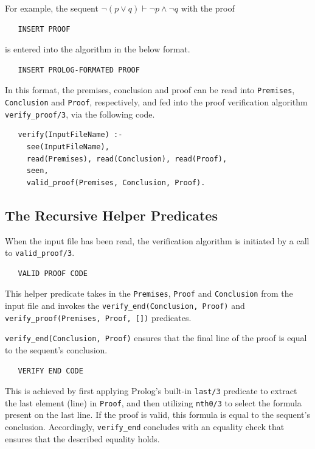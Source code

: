 \documentclass[a4paper, 11pt]{article}
\begin{document}
   For example, the sequent 
   $\neg (p \vee q) \vdash \neg p \wedge \neg q$ with the
   proof

\begin{verbatim}
   INSERT PROOF
\end{verbatim}

   is entered into the algorithm in the below format.

\begin{verbatim}
   INSERT PROLOG-FORMATED PROOF
\end{verbatim}

   In this format, the premises, conclusion and proof can be
   read into \texttt{Premises}, \texttt{Conclusion} and
   \texttt{Proof}, respectively, and fed into the proof
   verification algorithm \texttt{verify\_proof/3}, via the
   following code.

\begin{verbatim}
   verify(InputFileName) :-
     see(InputFileName),
     read(Premises), read(Conclusion), read(Proof),
     seen,
     valid_proof(Premises, Conclusion, Proof).
\end{verbatim}





   \subsection{The Recursive Helper Predicates}
   \label{recursive-helper-predicates}

   When the input file has been read, the verification
   algorithm is initiated by a call to
   \texttt{valid\_proof/3}. 
   
\begin{verbatim}
   VALID PROOF CODE
\end{verbatim}

   This helper predicate takes in the
   \texttt{Premises}, \texttt{Proof} and \texttt{Conclusion}
   from the input file and invokes the 
   \texttt{verify\_end(Conclusion, Proof)} and \\
   \texttt{verify\_proof(Premises, Proof, [])} predicates.
   \bigbreak

   \texttt{verify\_end(Conclusion, Proof)} ensures 
   that the final line of the proof is equal to the
   sequent's conclusion. 
   
\begin{verbatim}
   VERIFY END CODE
\end{verbatim}
   
   This is achieved by
   first applying Prolog's built-in \texttt{last/3}
   predicate to extract the last element (line) in
   \texttt{Proof}, and then utilizing \texttt{nth0/3} 
   to select the formula present on the last line. If
   the proof is valid, this formula is equal to
   the sequent's conclusion. Accordingly, 
   \texttt{verify\_end} concludes with an equality
   check that ensures that the described equality
   holds.
   \bigbreak
\end{document}
